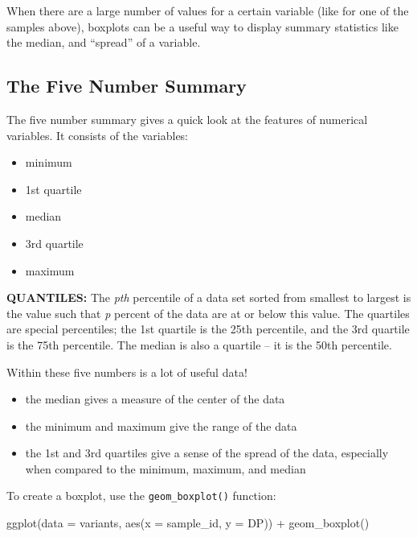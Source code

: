 \documentclass[
]{book}
\newenvironment{Shaded}{\begin{snugshade}}{\end{snugshade}}
\newcommand{\AttributeTok}[1]{\textcolor[rgb]{0.77,0.63,0.00}{#1}}
\newcommand{\FunctionTok}[1]{\textcolor[rgb]{0.00,0.00,0.00}{#1}}
\newcommand{\NormalTok}[1]{#1}
\newcommand{\SpecialCharTok}[1]{\textcolor[rgb]{0.00,0.00,0.00}{#1}}
\providecommand{\tightlist}{%
  \setlength{\itemsep}{0pt}\setlength{\parskip}{0pt}}
\begin{document}
When there are a large number of values for a certain variable (like for one of the samples above), boxplots can be a useful way to display summary statistics like the median, and ``spread'' of a variable.

\hypertarget{the-five-number-summary}{%
\subsection*{The Five Number Summary}\label{the-five-number-summary}}

The five number summary gives a quick look at the features of numerical variables. It consists of the variables:

\begin{itemize}
\tightlist
\item
  minimum
\item
  1st quartile
\item
  median
\item
  3rd quartile
\item
  maximum
\end{itemize}

\textbf{QUANTILES:} The \emph{pth} percentile of a data set sorted from smallest to largest is the value such that \emph{p} percent of the data are at or below this value. The quartiles are special percentiles; the 1st quartile is the 25th percentile, and the 3rd quartile is the 75th percentile. The median is also a quartile -- it is the 50th percentile.

Within these five numbers is a lot of useful data!

\begin{itemize}
\tightlist
\item
  the median gives a measure of the center of the data
\item
  the minimum and maximum give the range of the data
\item
  the 1st and 3rd quartiles give a sense of the spread of the data, especially when compared to the minimum, maximum, and median
\end{itemize}

To create a boxplot, use the \texttt{geom\_boxplot()} function:

\begin{Shaded}
\begin{Highlighting}[]
\FunctionTok{ggplot}\NormalTok{(}\AttributeTok{data =}\NormalTok{ variants, }\FunctionTok{aes}\NormalTok{(}\AttributeTok{x =}\NormalTok{ sample\_id, }\AttributeTok{y =}\NormalTok{ DP)) }\SpecialCharTok{+}
  \FunctionTok{geom\_boxplot}\NormalTok{()}
\end{Highlighting}
\end{Shaded}
\end{document}
